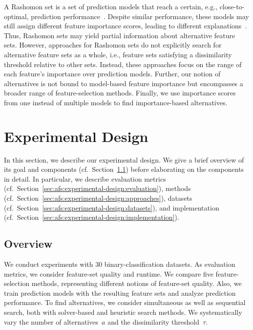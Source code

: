 \documentclass{article}
\theoremstyle{definition}
\begin{document}
A Rashomon set is a set of prediction models that reach a certain, e.g., close-to-optimal, prediction performance~\cite{fisher2019all}.
Despite similar performance, these models may still assign different feature importance scores, leading to different explanations~\cite{laberge2023partial}.
Thus, Rashomon sets may yield partial information about alternative feature sets.
However, approaches for Rashomon sets do not explicitly search for alternative feature sets as a whole, i.e., feature sets satisfying a dissimilarity threshold relative to other sets.
Instead, these approaches focus on the range of each feature's importance over prediction models.
Further, our notion of alternatives is not bound to model-based feature importance but encompasses a broader range of feature-selection methods.
Finally, we use importance scores from one instead of multiple models to find importance-based alternatives.

\section{Experimental Design}
\label{sec:afs:experimental-design}

In this section, we describe our experimental design.
We give a brief overview of its goal and components (cf.~Section~\ref{sec:afs:experimental-design:overview}) before elaborating on the components in detail.
In particular, we describe evaluation metrics (cf.~Section~\ref{sec:afs:experimental-design:evaluation}), methods (cf.~Section~\ref{sec:afs:experimental-design:approaches}), datasets (cf.~Section~\ref{sec:afs:experimental-design:datasets}), and implementation (cf.~Section~\ref{sec:afs:experimental-design:implementation}).

\subsection{Overview}
\label{sec:afs:experimental-design:overview}

We conduct experiments with 30 binary-classification datasets.
As evaluation metrics, we consider feature-set quality and runtime.
We compare five feature-selection methods, representing different notions of feature-set quality.
Also, we train prediction models with the resulting feature sets and analyze prediction performance.
To find alternatives, we consider simultaneous as well as sequential search, both with solver-based and heuristic search methods.
We systematically vary the number of alternatives~$a$ and the dissimilarity threshold~$\tau$.
\end{document}
